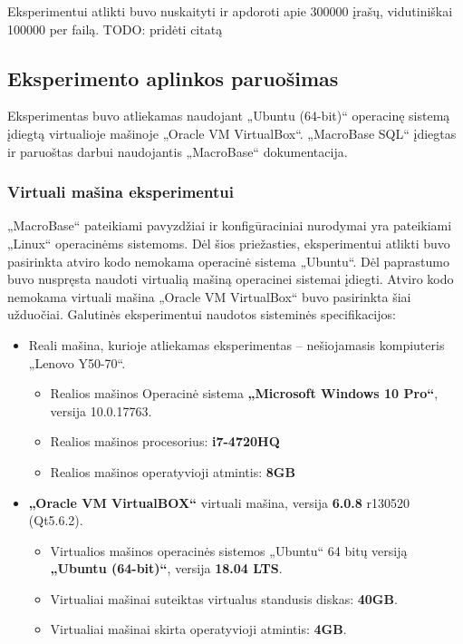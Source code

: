 \documentclass{VUMIFPSbakalaurinis}
\begin{document}
Eksperimentui atlikti buvo nuskaityti ir apdoroti apie 300000 įrašų, vidutiniškai 100000 per failą.
TODO: pridėti citatą
\subsection{Eksperimento aplinkos paruošimas}
Eksperimentas buvo atliekamas naudojant „Ubuntu (64-bit)“ operacinę sistemą įdiegtą virtualioje mašinoje „Oracle VM VirtualBox“. „MacroBase SQL“ įdiegtas ir paruoštas darbui naudojantis „MacroBase“ dokumentacija.

\subsubsection{Virtuali mašina eksperimentui}
„MacroBase“ pateikiami pavyzdžiai ir konfigūraciniai nurodymai yra pateikiami „Linux“ operacinėms sistemoms. Dėl šios priežasties, eksperimentui atlikti buvo pasirinkta atviro kodo nemokama operacinė sistema „Ubuntu“. Dėl paprastumo buvo nuspręsta naudoti virtualią mašiną operacinei sistemai įdiegti. Atviro kodo nemokama virtuali mašina „Oracle VM VirtualBox“ buvo pasirinkta šiai užduočiai. Galutinės eksperimentui naudotos sisteminės specifikacijos:
\begin{itemize}
	\item Reali mašina, kurioje atliekamas eksperimentas – nešiojamasis kompiuteris „Lenovo Y50-70“.
		\begin{itemize}
			\item Realios mašinos Operacinė sistema \textbf{„Microsoft Windows 10 Pro“}, versija	10.0.17763.
			\item Realios mašinos procesorius: \textbf{i7-4720HQ}
			\item Realios mašinos operatyvioji atmintis: \textbf{8GB}
		\end{itemize}
	\item \textbf{„Oracle VM VirtualBOX“} virtuali mašina, versija  \textbf{6.0.8} r130520 (Qt5.6.2). 
		\begin{itemize}
			\item Virtualios mašinos operacinės sistemos „Ubuntu“ 64 bitų versiją \textbf{„Ubuntu (64-bit)“}, versija \textbf{18.04 LTS}.
			\item Virtualiai mašinai suteiktas virtualus standusis diskas: \textbf{40GB}.
			\item Virtualiai mašinai skirta operatyvioji atmintis: \textbf{4GB}.
		\end{itemize}
\end{itemize}
\end{document}

